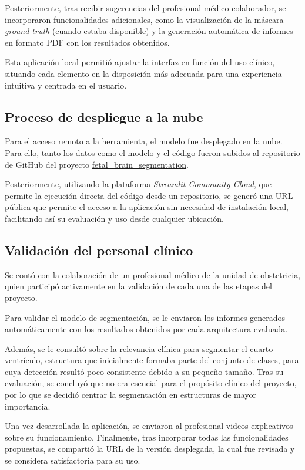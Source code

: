 Posteriormente, tras recibir sugerencias del profesional médico colaborador, se incorporaron funcionalidades adicionales, como la visualización de la máscara \textit{ground truth} (cuando estaba disponible) y la generación automática de informes en formato PDF con los resultados obtenidos.

Esta aplicación local permitió ajustar la interfaz en función del uso clínico, situando cada elemento en la disposición más adecuada para una experiencia intuitiva y centrada en el usuario.

\subsection{Proceso de despliegue a la nube}
Para el acceso remoto a la herramienta, el modelo fue desplegado en la nube. Para ello, tanto los datos como el modelo y el código fueron subidos al repositorio de GitHub del proyecto \href{https://github.com/eirarodriguez/fetal_brain_segmentation} {fetal\_brain\_segmentation}. 

Posteriormente, utilizando la plataforma \textit{Streamlit Community Cloud}, que permite la ejecución directa del código desde un repositorio, se generó una URL pública que permite el acceso a la aplicación sin necesidad de instalación local, facilitando así su evaluación y uso desde cualquier ubicación.


\subsection{Validación del personal clínico} 
Se contó con la colaboración de un profesional médico de la unidad de obstetricia, quien participó activamente en la validación de cada una de las etapas del proyecto.

Para validar el modelo de segmentación, se le enviaron los informes generados automáticamente con los resultados obtenidos por cada arquitectura evaluada. 

Además, se le consultó sobre la relevancia clínica para segmentar el cuarto ventrículo, estructura que inicialmente formaba parte del conjunto de clases, para cuya detección resultó poco consistente debido a su pequeño tamaño. Tras su evaluación, se concluyó que no era esencial para el propósito clínico del proyecto, por lo que se decidió centrar la segmentación en estructuras de mayor importancia.

Una vez desarrollada la aplicación, se enviaron al profesional videos explicativos sobre su funcionamiento. Finalmente, tras incorporar todas las funcionalidades propuestas, se compartió la URL de la versión desplegada, la cual fue revisada y se considera satisfactoria para su uso.


